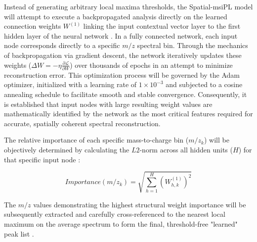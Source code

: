 \documentclass[
12pt, %
oneside, %
english, %
onehalfspacing, %
nolistspacing, %
headsepline, %
]{MastersDoctoralThesis} %
\begin{document}
Instead of generating arbitrary local maxima thresholds, the Spatial-msiPL model will attempt to execute a backpropagated analysis directly on the learned connection weights $W^{(1)}$ linking the input contextual vector layer to the first hidden layer of the neural network \citep{abdelmoula2021peak}. In a fully connected network, each input node corresponds directly to a specific $m/z$ spectral bin. Through the mechanics of backpropagation via gradient descent, the network iteratively updates these weights ($\Delta W=-\eta \frac{\partial \mathcal{L}}{\partial W}$) over thousands of epochs in an attempt to minimize reconstruction error. This optimization process will be governed by the Adam optimizer, initialized with a learning rate of $1\times 10^{-3}$ and subjected to a cosine annealing schedule to facilitate smooth and stable convergence. Consequently, it is established that input nodes with large resulting weight values are mathematically identified by the network as the most critical features required for accurate, spatially coherent spectral reconstruction.

The relative importance of each specific mass-to-charge bin ($m/z_k$) will be objectively determined by calculating the $L2$-norm across all hidden units ($H$) for that specific input node \citep{abdelmoula2021peak}:

$$ Importance(m/z_k)=\sqrt{\sum_{h=1}^{H} (W^{(1)}_{h, k})^2} $$

The $m/z$ values demonstrating the highest structural weight importance will be subsequently extracted and carefully cross-referenced to the nearest local maximum on the average spectrum to form the final, threshold-free "learned" peak list \citep{abdelmoula2021peak}.

\end{document}
